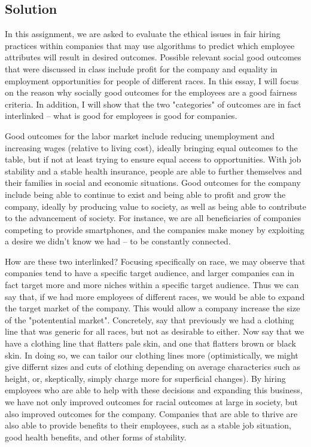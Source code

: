 \documentclass[submit]{harvardml}
\newenvironment{answer}{%
    \color{answergreen}\bf}
  {%
  }
\begin{document}
\subsection*{Solution}
    \begin{answer}

In this assignment, we are asked to evaluate the ethical issues in fair hiring practices within
companies that may use algorithms to predict which employee attributes will result in desired
outcomes. Possible relevant social good outcomes that were discussed in class include profit for the
company and equality in employment opportunities for people of different races. In this essay, I
will focus on the reason why socially good outcomes for the employees are a good fairness criteria.
In addition, I will show that the two "categories" of outcomes are in fact interlinked -- what is
good for employees is good for companies.

Good outcomes for the labor market include reducing unemployment and increasing wages
(relative to living cost), ideally bringing equal outcomes to the table, but if not at least trying
to ensure equal access to opportunities. With job stability and a stable health insurance, people
are able to further themselves and their families in social and economic situations. Good outcomes
for the company include being able to continue to exist and being able to profit and grow the
company, ideally by producing value to society, as well as being able to contribute to the
advancement of society. For instance, we are all beneficiaries of companies competing to provide
smartphones, and the companies make money by exploiting a desire we didn't know we had -- to be
constantly connected.

How are these two interlinked? Focusing specifically on race, we may observe that companies tend to have a specific target audience, and larger companies can in fact target more and more niches within a specific target
audience. Thus we can say that, if we had more employees of different races, we would be able to
expand the target market of the company. This would allow a company increase the
size of the "potentential market".  Concretely, say that previously we had a clothing line that was
generic for all races, but not as desirable to either. Now say that we have a clothing line that flatters
pale skin, and one that flatters brown or black skin. In doing so, we can tailor our clothing lines
more (optimistically, we might give differnt sizes and cuts of clothing depending on average
characterics such as height, or, skeptically, simply charge more for superficial changes). By hiring
employees who are able to help with these decisions and expanding this business, we have not only
improved outcomes for racial outcomes at large in society, but also improved outcomes for the
company. Companies that are able to thrive are also able to provide benefits to their employees,
such as a stable job situation, good health benefits, and other forms of stability.


\end{answer}
\end{document}
